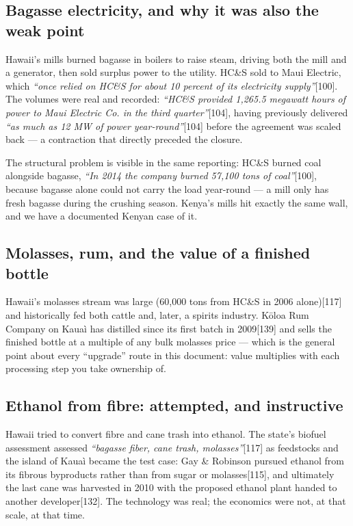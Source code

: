 \documentclass[11pt]{article}
\newcommand{\src}[1]{[#1]}
\begin{document}
\subsection{Bagasse electricity, and why it was also the weak point}

Hawaii's mills burned bagasse in boilers to raise steam, driving both the mill
and a generator, then sold surplus power to the utility. HC\&S sold to Maui
Electric, which \emph{``once relied on HC\&S for about 10 percent of its
electricity supply''}\src{100}. The volumes were real and recorded: \emph{``HC\&S
provided 1,265.5 megawatt hours of power to Maui Electric Co. in the third
quarter''}\src{104}, having previously delivered \emph{``as much as 12 MW of
power year-round''}\src{104} before the agreement was scaled back --- a
contraction that directly preceded the closure.

The structural problem is visible in the same reporting: HC\&S burned coal
alongside bagasse, \emph{``In 2014 the company burned 57,100 tons of coal''}\src{100},
because bagasse alone could not carry the load year-round --- a mill only has
fresh bagasse during the crushing season. Kenya's mills hit exactly the same
wall, and we have a documented Kenyan case of it.

\subsection{Molasses, rum, and the value of a finished bottle}

Hawaii's molasses stream was large (60{,}000 tons from HC\&S in 2006 alone)\src{117}
and historically fed both cattle and, later, a spirits industry. K\=oloa Rum
Company on Kaua\`i has distilled since its first batch in 2009\src{139} and
sells the finished bottle at a multiple of any bulk molasses price --- which is
the general point about every ``upgrade'' route in this document: value
multiplies with each processing step you take ownership of.

\subsection{Ethanol from fibre: attempted, and instructive}

Hawaii tried to convert fibre and cane trash into ethanol. The state's biofuel
assessment assessed \emph{``bagasse fiber, cane trash, molasses''}\src{117} as
feedstocks and the island of Kaua\`i became the test case: Gay \& Robinson
pursued ethanol from its fibrous byproducts rather than from sugar or
molasses\src{115}, and ultimately the last cane was harvested in 2010 with the
proposed ethanol plant handed to another developer\src{132}. The technology was
real; the economics were not, at that scale, at that time.
\end{document}
